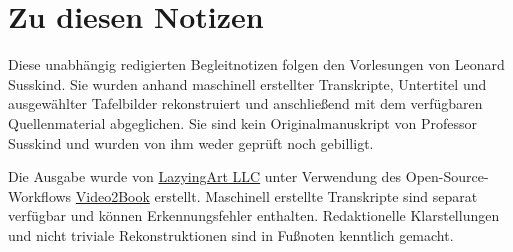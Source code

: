 \documentclass[11pt,oneside]{book}
\begin{document}
\frontmatter
\hypersetup{pageanchor=false}

\hypersetup{pageanchor=true}

\clearpage
\chapter{Zu diesen Notizen}
Diese unabhängig redigierten Begleitnotizen folgen den Vorlesungen von Leonard Susskind. Sie wurden anhand maschinell erstellter Transkripte, Untertitel und ausgewählter Tafelbilder rekonstruiert und anschließend mit dem verfügbaren Quellenmaterial abgeglichen. Sie sind kein Originalmanuskript von Professor Susskind und wurden von ihm weder geprüft noch gebilligt.

Die Ausgabe wurde von \href{https://lazying.art}{LazyingArt LLC} unter Verwendung des Open-Source-Workflows \href{https://github.com/lachlanchen/Video2Book}{Video2Book} erstellt. Maschinell erstellte Transkripte sind separat verfügbar und können Erkennungsfehler enthalten. Redaktionelle Klarstellungen und nicht triviale Rekonstruktionen sind in Fußnoten kenntlich gemacht.
\clearpage
\tableofcontents
\mainmatter










\end{document}
